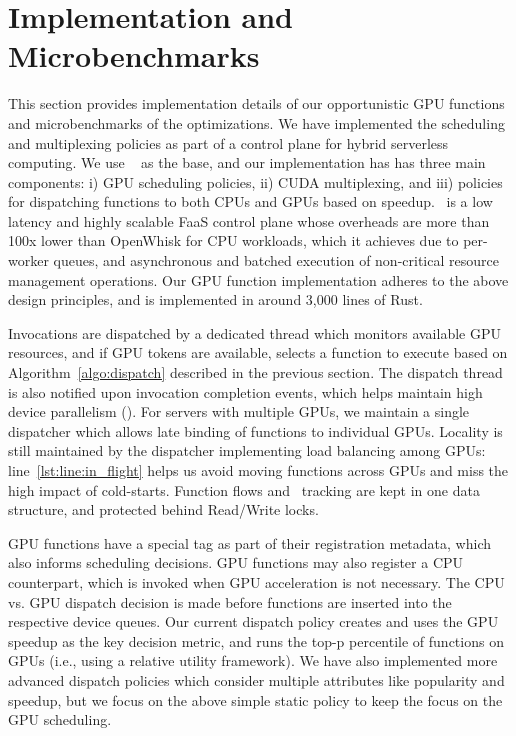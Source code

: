 \vspace*{-0.4cm}
\section{Implementation and Microbenchmarks}
\vspace*{\subsecspace}
\label{sec:impl}

This section provides implementation details of our opportunistic GPU functions and microbenchmarks of the optimizations. 
We have implemented the scheduling and multiplexing policies as part of a control plane for hybrid serverless computing.
We use \sysname~\cite{fuerst2023iluvatar} as the base, and our implementation has has three main components: i) GPU scheduling policies, ii) CUDA multiplexing, and iii) policies for dispatching functions to both CPUs and GPUs based on speedup.
\sysname~is a low latency and highly scalable FaaS control plane whose overheads are more than 100x lower than OpenWhisk for CPU workloads, which it achieves due to per-worker queues, and asynchronous and batched execution of non-critical resource management operations. 
Our GPU function implementation adheres to the above design principles, and is implemented in around 3,000 lines of Rust. 

Invocations are dispatched by a dedicated thread which monitors available GPU resources, and if GPU tokens are available, selects a function to execute based on Algorithm~\ref{algo:dispatch} described in the previous section.
The dispatch thread is also notified upon invocation completion events, which helps maintain high device parallelism (\D). 
For servers with multiple GPUs, we maintain a single dispatcher which allows late binding of functions to individual GPUs.
Locality is still maintained by the dispatcher implementing  load balancing among GPUs: line~\ref{lst:line:in_flight} helps us avoid moving functions across GPUs and miss the high impact of cold-starts.
Function flows and \VT~tracking are kept in one data structure, and protected behind Read/Write locks. 

GPU functions have a special  tag as part of their registration metadata, which also informs scheduling decisions.
GPU functions may also register a CPU counterpart, which is invoked when GPU acceleration is not necessary.
The CPU vs. GPU dispatch decision is made before functions are inserted into the respective device queues.
Our current dispatch policy creates and uses the GPU speedup as the key decision metric, and runs the top-p percentile of functions on GPUs (i.e., using a relative utility framework).
We have also implemented more advanced dispatch policies which consider multiple attributes like popularity and speedup, but we focus on the above simple static policy to keep the focus on the GPU scheduling. 


